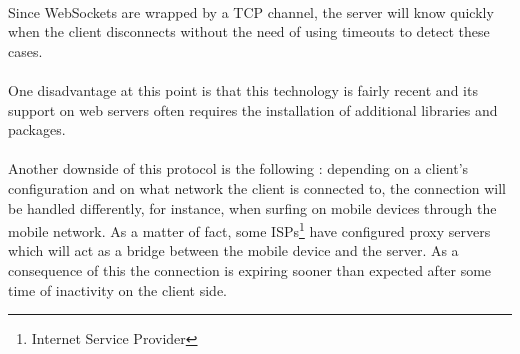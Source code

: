 \paragraph{} Since WebSockets are wrapped by a TCP channel, the server will know 
quickly when the client disconnects without the need of using timeouts to 
detect these cases.

\paragraph{} One disadvantage at this point is that this technology is fairly 
recent and its support on web servers often requires the installation of 
additional libraries and packages.

\paragraph{} Another downside of this protocol is the following : depending on 
a client's configuration and on what network the client is connected to, the 
connection will be handled differently, for instance, when surfing on mobile 
devices through the mobile network. As a matter of fact, some 
ISPs\footnote{Internet Service Provider} have configured proxy servers which 
will act as a bridge between the mobile device and the server. As a consequence 
of this the connection is expiring sooner than expected after some time of 
inactivity on the 
client side.